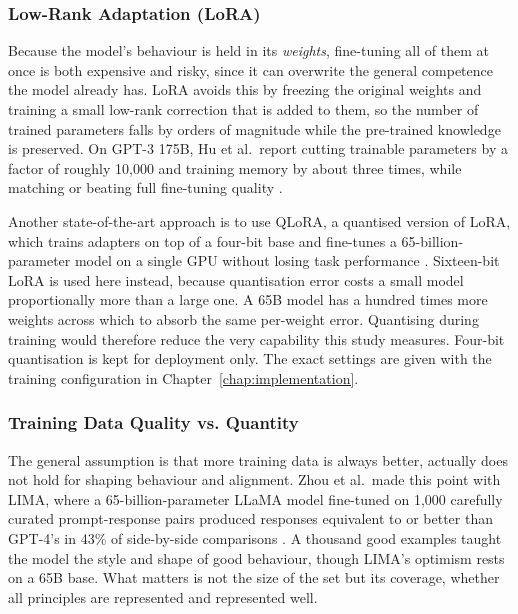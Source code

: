 \subsubsection{Low-Rank Adaptation (LoRA)}
\label{subsec:low-rank-adaptation-lora}

Because the model's behaviour is held in its \emph{weights}, fine-tuning all of them at once is both expensive and risky, since it can overwrite the general competence the model already has. LoRA avoids this by freezing the original weights and training a small low-rank correction that is added to them, so the number of trained parameters falls by orders of magnitude while the pre-trained knowledge is preserved. On GPT-3 175B, Hu et al.\ report cutting trainable parameters by a factor of roughly 10{,}000 and training memory by about three times, while matching or beating full fine-tuning quality \cite{hu2021loralowrankadaptationlarge}.

Another state-of-the-art approach is to use QLoRA, a quantised version of LoRA, which trains adapters on top of a four-bit base and fine-tunes a 65-billion-parameter model on a single GPU without losing task performance \cite{dettmers2023qloraefficientfinetuningquantized}. Sixteen-bit LoRA is used here instead, because quantisation error costs a small model proportionally more than a large one. A 65B model has a hundred times more weights across which to absorb the same per-weight error. Quantising during training would therefore reduce the very capability this study measures. Four-bit quantisation is kept for deployment only. The exact settings are given with the training configuration in Chapter~\ref{chap:implementation}.

\subsubsection{Training Data Quality vs. Quantity}
\label{subsec:training-data-quality-vs-quantity}

The general assumption is that more training data is always better, actually does not hold for shaping behaviour and alignment. Zhou et al.\ made this point with LIMA, where a 65-billion-parameter LLaMA model fine-tuned on 1,000 carefully curated prompt-response pairs produced responses equivalent to or better than GPT-4's in 43\% of side-by-side comparisons \cite{zhou2023limaalignment}. A thousand good examples taught the model the style and shape of good behaviour, though LIMA's optimism rests on a 65B base. What matters is not the size of the set but its coverage, whether all principles are represented and represented well.

